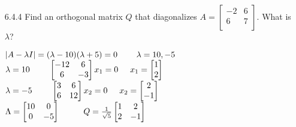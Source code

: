 \documentclass[10pt,twoside,reqno]{article}
\begin{document}
\begin{enumerate}
\item[6.4.4] Find an orthogonal matrix $Q$ that diagonalizes $A=
\begin{bmatrix}
-2&6\\
6&7\\
\end{bmatrix}$. What is $\lambda$?
\\ \vspace{2mm}
\begin{center}
$
|A- \lambda I|=
(\lambda-10)(\lambda+5) = 0
\hspace{8mm} \lambda=10,-5
$\\
$
\lambda = 10 \hspace{8mm}
\begin{bmatrix}
-12&6\\
6&-3\\
\end{bmatrix}
x_1=0
\hspace{5mm}
x_1 = 
\begin{bmatrix}
1\\
2\\
\end{bmatrix}
$ \\
$
\lambda = -5 \hspace{8mm}
\begin{bmatrix}
3&6\\
6&12\\
\end{bmatrix}
x_2=0
\hspace{5mm}
x_2 = 
\begin{bmatrix}
2\\
-1\\
\end{bmatrix}
$ \\
$
\Lambda = 
\begin{bmatrix}
10&0\\
0&-5\\
\end{bmatrix}
\hspace{10mm}
Q=
\frac{1}{\sqrt{5}}
\begin{bmatrix}
1&2\\
2&-1\\
\end{bmatrix}
$ \\
\end{center}


\end{enumerate}
\end{document}
